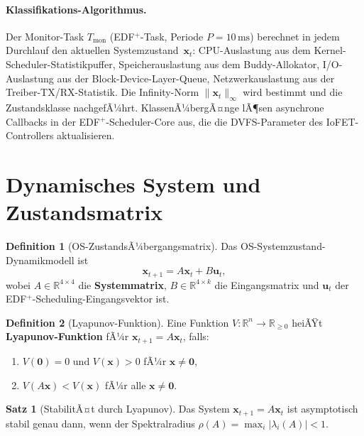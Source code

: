 ﻿\documentclass[a4paper,12pt]{scrreprt}
\theoremstyle{definition}
\newtheorem{definition}{Definition}[chapter]
\newtheorem{satz}{Satz}[chapter]
\begin{document}
	\paragraph{Klassifikations-Algorithmus.}
	Der Monitor-Task $T_{\mathrm{mon}}$ (EDF$^+$-Task, Periode $P = 10\,\text{ms}$)
	berechnet in jedem Durchlauf den aktuellen Systemzustand~$\mathbf{x}_t$:
	CPU-Auslastung aus dem Kernel-Scheduler-Statistikpuffer, Speicherauslastung
	aus dem Buddy-Allokator, I/O-Auslastung aus der Block-Device-Layer-Queue,
	Netzwerkauslastung aus der Treiber-TX/RX-Statistik. Die Infinity-Norm
	$\|\mathbf{x}_t\|_\infty$ wird bestimmt und die Zustandsklasse nachgefÃ¼hrt.
	KlassenÃ¼bergÃ¤nge lÃ¶sen asynchrone Callbacks in der EDF$^+$-Scheduler-Core
	aus, die die DVFS-Parameter des IoFET-Controllers aktualisieren.

	\section{Dynamisches System und Zustandsmatrix}
	
	\begin{definition}[OS-ZustandsÃ¼bergangsmatrix]
		Das OS-Systemzustand-Dynamikmodell ist
		\[
		\mathbf{x}_{t+1} = A \mathbf{x}_t + B \mathbf{u}_t,
		\]
		wobei $A \in \mathbb{R}^{4 \times 4}$ die \textbf{Systemmatrix},
		$B \in \mathbb{R}^{4 \times k}$ die Eingangsmatrix und
		$\mathbf{u}_t$ der EDF$^+$-Scheduling-Eingangsvektor ist.
	\end{definition}
	
	\begin{definition}[Lyapunov-Funktion]
		Eine Funktion $V: \mathbb{R}^n \to \mathbb{R}_{\geq 0}$ heiÃŸt
		\textbf{Lyapunov-Funktion} fÃ¼r $\mathbf{x}_{t+1} = A\mathbf{x}_t$, falls:
		\begin{enumerate}
			\item $V(\mathbf{0}) = 0$ und $V(\mathbf{x}) > 0$ fÃ¼r $\mathbf{x} \neq \mathbf{0}$,
			\item $V(A\mathbf{x}) < V(\mathbf{x})$ fÃ¼r alle $\mathbf{x} \neq \mathbf{0}$.
		\end{enumerate}
	\end{definition}
	
	\begin{satz}[StabilitÃ¤t durch Lyapunov]\label{satz:lyap_prelim}
		Das System $\mathbf{x}_{t+1} = A\mathbf{x}_t$ ist asymptotisch stabil
		genau dann, wenn der Spektralradius
		$\rho(A) = \max_i |\lambda_i(A)| < 1$.
	\end{satz}
	
\end{document}
